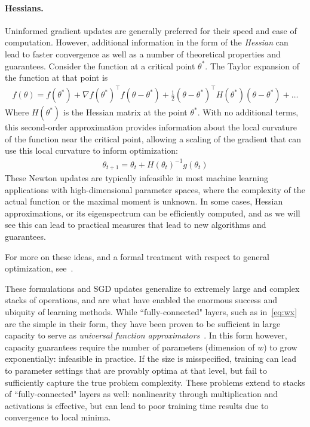 \paragraph{Hessians.}
Uninformed gradient updates
are generally preferred
for their speed and ease of computation.
However, additional information in the form of the \textit{Hessian}
can lead to faster convergence
as well as a number of theoretical properties and guarantees.
Consider the function at a critical point $\theta^*$.
The Taylor expansion of the function at that point is
\begin{align}
f(\theta) = f(\theta^*) + \nabla f(\theta^*)^\top f(\theta - \theta^*) + \frac{1}{2}(\theta - \theta^*)^\top H(\theta^*)(\theta - \theta^*) + \ldots
\end{align}
Where $H(\theta^*)$ is the Hessian matrix at the point $\theta^*$. 
With no additional terms, this second-order approximation provides information
about the local curvature of the function near the critical point,
allowing a scaling of the gradient that can use this local 
curvature to inform optimization:
\begin{align}\label{eq:newtonstep}
	\theta_{t+1} = \theta_t + H(\theta_t)^{-1} g(\theta_t)
\end{align}
These Newton updates are typically infeasible in most
machine learning applications with high-dimensional
parameter spaces, where the complexity of
the actual function or the maximal moment is unknown.
In some cases, Hessian approximations,
or its eigenspectrum can be efficiently computed,
and as we will see this can lead to 
practical measures that lead to new
algorithms and guarantees.

For more on these ideas, 
and a formal treatment with respect to 
general optimization, see~\cite{wright1999numerical}.

These formulations and SGD updates generalize
to extremely large and complex stacks
of operations, and are what have enabled
the enormous success and ubiquity of learning
methods.
While ``fully-connected" layers, such as
in~\eqref{eq:wx} are the simple in their form,
they have been proven to be sufficient
in large capacity to serve as
\textit{universal function approximators}~\citep{cybenko1989approximation}.
In this form however, capacity guarantees
require the number of parameters (dimension of $w$)
to grow exponentially: infeasible in practice.
If the size is misspecified, training
can lead to parameter settings that are provably
optima at that level, but fail to sufficiently
capture the true problem complexity.
These problems extend to stacks of ``fully-connected"
layers as well: nonlinearity through multiplication
and activations is effective, but can lead
to poor training time results due to
convergence to local minima.

